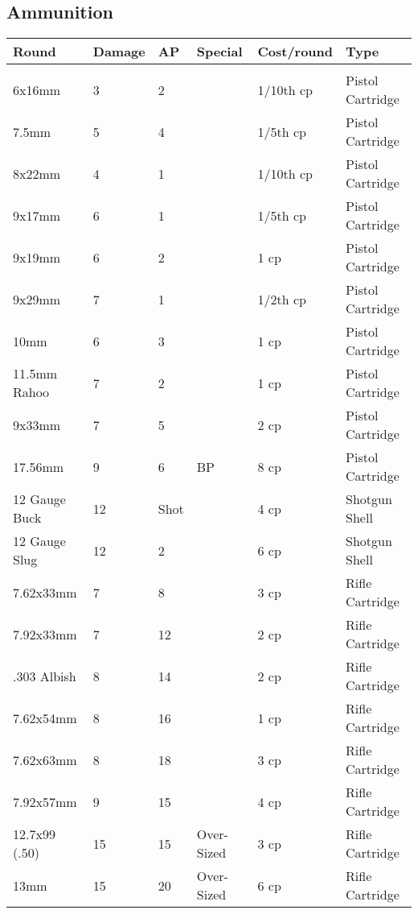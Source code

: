 \documentclass[a4paper, twocolumn, openany]{book}
\begin{document}
{{	%
	\subsection{Ammunition}

	{\centering
	\begin{tabular}{llllll}
	Round & Damage & AP & Special & Cost/round & Type  \\ \hline \\
	6x16mm 						& 3 	& 2 	& 					& 1/10th cp 		& Pistol Cartridge 	\\
	7.5mm 						& 5 	& 4 	& 					& 1/5th cp 			& Pistol Cartridge 	\\
	8x22mm 						& 4 	& 1 	& 					& 1/10th cp 		& Pistol Cartridge 	\\
	9x17mm 						& 6 	& 1 	& 					& 1/5th cp 			& Pistol Cartridge 	\\
	9x19mm 						& 6 	& 2 	& 					& 1 cp 				& Pistol Cartridge 	\\
	9x29mm 						& 7 	& 1 	& 					& 1/2th cp 			& Pistol Cartridge 	\\
	10mm 						& 6 	& 3 	& 					& 1 cp 				& Pistol Cartridge 	\\
	11.5mm Rahoo 				& 7 	& 2 	& 					& 1 cp 				& Pistol Cartridge 	\\
	9x33mm 						& 7 	& 5 	& 					& 2 cp 				& Pistol Cartridge 	\\
	17.56mm 					& 9 	& 6 	& BP				& 8 cp 				& Pistol Cartridge 	\\
	12 Gauge Buck 				& 12\dag& Shot 	& 					& 4 cp 				& Shotgun Shell 	\\
	12 Gauge Slug 				& 12 	& 2 	& 					& 6 cp 				& Shotgun Shell 	\\
	7.62x33mm 					& 7 	& 8 	& 					& 3 cp 				& Rifle Cartridge 	\\
	7.92x33mm 					& 7 	& 12 	& 					& 2 cp 				& Rifle Cartridge 	\\
	.303 Albish 				& 8 	& 14 	& 					& 2 cp 				& Rifle Cartridge 	\\
	7.62x54mm 					& 8 	& 16 	& 					& 1 cp 				& Rifle Cartridge 	\\
	7.62x63mm 					& 8 	& 18 	& 					& 3 cp 				& Rifle Cartridge 	\\
	7.92x57mm 					& 9 	& 15 	& 					& 4 cp 				& Rifle Cartridge 	\\
	12.7x99 (.50) 				& 15 	& 15 	& Over-Sized		& 3 cp 				& Rifle Cartridge 	\\
	13mm 						& 15 	& 20 	& Over-Sized		& 6 cp 				& Rifle Cartridge 	\\

\end{tabular}}}}
\end{document}
